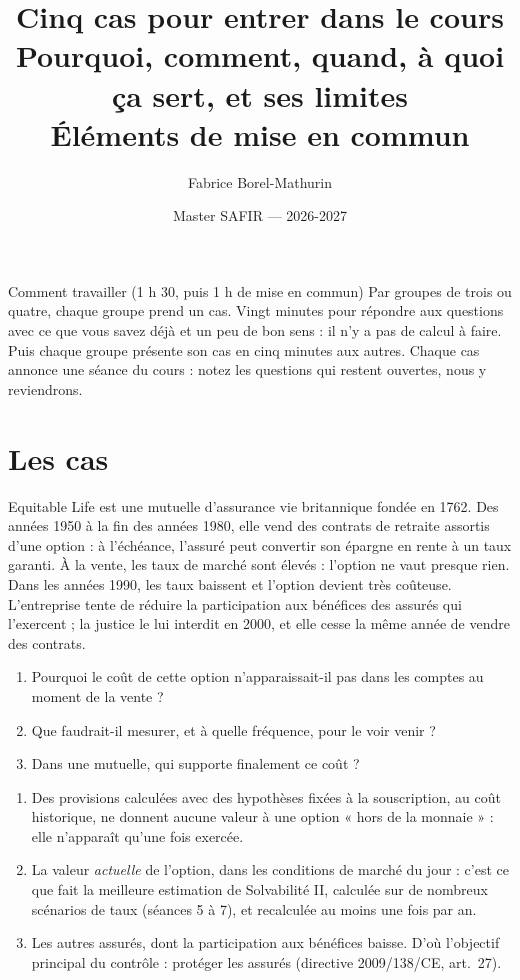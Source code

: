 \documentclass[11pt,a4paper]{article}
\title{\vspace{-1.5cm}\sffamily\bfseries\color{bleuactu}
       Cinq cas pour entrer dans le cours\\[2mm]
       \large\mdseries\color{black}Pourquoi, comment, quand, à quoi ça sert, et ses limites
       \ifcorrection\\[1mm]\color{vertactu}Éléments de mise en commun\fi}
\author{\sffamily Fabrice Borel-Mathurin}
\date{\sffamily\small Master SAFIR --- 2026-2027}
\begin{document}
\maketitle
\thispagestyle{empty}

\begin{notion}{Comment travailler (1 h 30, puis 1 h de mise en commun)}
Par groupes de trois ou quatre, chaque groupe prend un cas. Vingt minutes pour répondre aux
questions avec ce que vous savez déjà et un peu de bon sens : il n'y a pas de calcul à faire. Puis
chaque groupe présente son cas en cinq minutes aux autres. Chaque cas annonce une séance du cours :
notez les questions qui restent ouvertes, nous y reviendrons.
\end{notion}

\section{Les cas}

\begin{exercice}
Equitable Life est une mutuelle d'assurance vie britannique fondée en 1762. Des années 1950 à la
fin des années 1980, elle vend des contrats de retraite assortis d'une option : à l'échéance,
l'assuré peut convertir son épargne en rente à un taux garanti. À la vente, les taux de marché sont
élevés : l'option ne vaut presque rien. Dans les années 1990, les taux baissent et l'option devient
très coûteuse. L'entreprise tente de réduire la participation aux bénéfices des assurés qui
l'exercent ; la justice le lui interdit en 2000, et elle cesse la même année de vendre des contrats.
\begin{enumerate}[nosep]
  \item Pourquoi le coût de cette option n'apparaissait-il pas dans les comptes au moment de la vente ?
  \item Que faudrait-il mesurer, et à quelle fréquence, pour le voir venir ?
  \item Dans une mutuelle, qui supporte finalement ce coût ?
\end{enumerate}
\end{exercice}
\begin{corrige}
\begin{enumerate}[nosep]
  \item Des provisions calculées avec des hypothèses fixées à la souscription, au coût historique,
        ne donnent aucune valeur à une option « hors de la monnaie » : elle n'apparaît qu'une fois
        exercée.
  \item La valeur \emph{actuelle} de l'option, dans les conditions de marché du jour : c'est ce que
        fait la meilleure estimation de Solvabilité II, calculée sur de nombreux scénarios de taux
        (séances 5 à 7), et recalculée au moins une fois par an.
  \item Les autres assurés, dont la participation aux bénéfices baisse. D'où l'objectif principal
        du contrôle : protéger les assurés (directive 2009/138/CE, art.~27).
\end{enumerate}
\end{corrige}
\end{document}
